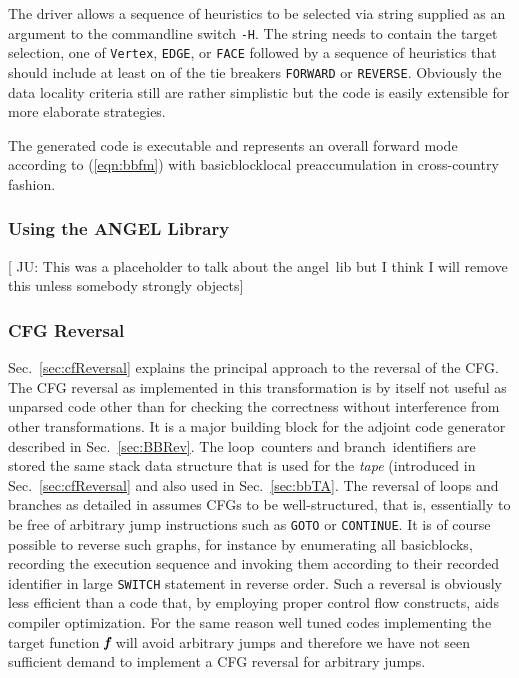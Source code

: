 \documentclass{book}
\newcommand{\angel}{angel}
\newcommand{\Loop}{loop}
\newcommand{\branch}{branch}
\newcommand{\basicblock}{basicblock}
\newcommand{\bmf}{\mbox{\bf\em f}}
\newcommand{\refsec}[1]{{Sec.~\ref{#1}}}
\newcommand{\refeqn}[1]{{(\ref{#1})}}
\begin{document}
The driver allows a sequence of heuristics to be selected via string supplied as 
an argument to the commandline switch \lstinline{-H}. The string needs to contain 
the target selection, one of \lstinline{Vertex}, \lstinline{EDGE}, or \lstinline{FACE} followed by 
a sequence of heuristics that should include at least on of the tie breakers \lstinline{FORWARD} or 
\lstinline{REVERSE}. 
Obviously the data locality criteria still are rather simplistic but 
the code is easily extensible for more elaborate strategies. 

The generated code is executable and represents an overall forward mode 
according to \refeqn{eqn:bbfm} with \basicblock\-local preaccumulation in 
cross-country fashion. 

\subsubsection{Using the ANGEL Library}\label{sec:angel}
{\color{red} [ JU: This was a placeholder to talk about the \angel\ lib 
  but I think I will remove this unless somebody strongly objects]}
\subsubsection{CFG Reversal}\label{sec:cfgRevAlg}

\refsec{sec:cfReversal} explains the principal approach to the reversal 
of the CFG. The CFG reversal as implemented in this transformation is 
by itself not useful as unparsed code other than for checking the correctness without 
interference from other transformations. It is a major building block for 
the  
adjoint code generator described in \refsec{sec:BBRev}. 
The \Loop\ counters and \branch\ identifiers are stored the same 
stack data structure that is used for the {\em tape} (introduced in 
\refsec{sec:cfReversal} and also used in \refsec{sec:bbTA}.  
The reversal of loops and branches as detailed in \cite{Utke2006ERo} assumes 
CFGs to be well-structured, that is, essentially to be free of arbitrary jump instructions 
such as \lstinline{GOTO} or \lstinline{CONTINUE}. 
It is of course possible to reverse such graphs, for instance by enumerating
all {\basicblock}s, recording the execution sequence and invoking them according 
to their recorded identifier in  large  \lstinline {SWITCH} statement in reverse order.
Such a reversal is obviously less efficient than a code that, by employing proper 
control flow constructs, aids compiler optimization. 
For the same reason well tuned codes implementing the target function $\bmf$ will 
avoid arbitrary jumps and therefore we have not seen sufficient demand to implement 
a CFG reversal for arbitrary jumps. 
\end{document}
